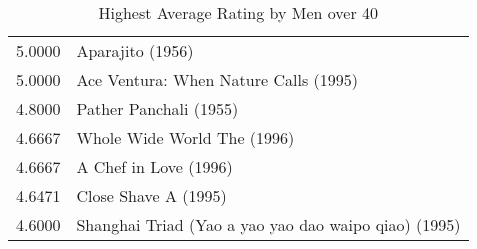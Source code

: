 \begin{flushleft}
\begin{table}[h]
\begin{tabular}{|ll|}
5.0000 & Aparajito (1956)                                      \\
5.0000 & Ace Ventura: When Nature Calls (1995)                 \\ \hline
4.8000 & Pather Panchali (1955)                                \\ \hline
4.6667 & Whole Wide World The (1996)                           \\
4.6667 & A Chef in Love (1996)                                 \\ \hline
4.6471 & Close Shave A (1995)                                  \\ \hline
4.6000 & Shanghai Triad (Yao a yao yao dao waipo qiao) (1995)  \\ \hline
\end{tabular}
\caption{Highest Average Rating by Men over 40}
\end{table}


\end{flushleft}
